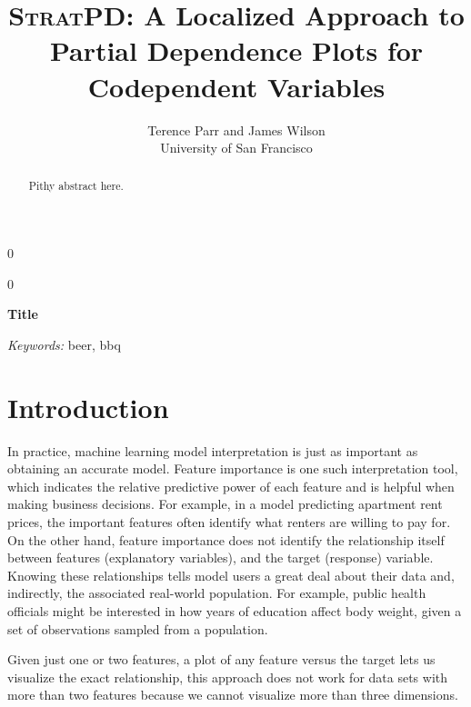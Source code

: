 \documentclass[12pt]{article}
\newcommand{\blind}{0}
\begin{document}
\def\spacingset#1{\renewcommand{\baselinestretch}%
{#1}\small\normalsize} \spacingset{1}



\blind
{
  \title{{\textsc{StratPD}}: \bf A Localized Approach to Partial Dependence Plots for Codependent Variables}

  \author{Terence Parr and James Wilson\\
      University of San Francisco\\
}
  \maketitle
} \fi

\blind
{
  \bigskip
  \bigskip
  \bigskip
  \begin{center}
    {\LARGE\bf Title}
\end{center}
  \medskip
} \fi

\bigskip
\begin{abstract}
Pithy abstract here.
\end{abstract}

\noindent%
{\it Keywords:} beer, bbq

\section{Introduction}
\label{sec:intro}

In practice, machine learning model interpretation is just as important as obtaining an accurate model. Feature importance is one such interpretation tool, which indicates the relative predictive power of each feature and is helpful when making business decisions. For example, in a model predicting apartment rent prices, the important features often identify what renters are willing to pay for. On the other hand, feature importance does not identify the relationship itself between features (explanatory variables),  and the target (response) variable.  Knowing these relationships tells model users a great deal about their data and, indirectly, the associated real-world population. For example, public health officials might be interested in how years of education affect body weight, given a set of observations sampled from a population.

Given just one or two features, a plot of any feature versus the target lets us visualize the exact relationship, this approach does not work for data sets with more than two features because we cannot visualize more than three dimensions.
\end{document}
